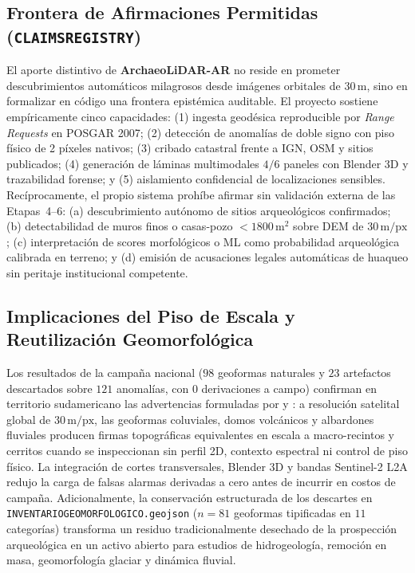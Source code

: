 \documentclass[11pt,a4paper]{article}
\DeclareRobustCommand{\_}{\ifmmode\mbox{\textunderscore}\else\textunderscore\allowbreak\fi}
\begin{document}
\subsection{Frontera de Afirmaciones Permitidas (\texttt{CLAIMS\_REGISTRY})}

El aporte distintivo de \textbf{ArchaeoLiDAR-AR} no reside en prometer descubrimientos autom\'aticos milagrosos desde im\'agenes orbitales de $30\,\mathrm{m}$, sino en formalizar en c\'odigo una frontera epist\'emica auditable. El proyecto sostiene emp\'iricamente cinco capacidades: (1) ingesta geod\'esica reproducible por \emph{Range Requests} en POSGAR 2007; (2) detecci\'on de anomal\'ias de doble signo con piso f\'isico de 2 p\'ixeles nativos; (3) cribado catastral frente a IGN, OSM y sitios publicados; (4) generaci\'on de l\'aminas multimodales $4/6$ paneles con Blender 3D y trazabilidad forense; y (5) aislamiento confidencial de localizaciones sensibles. Rec\'iprocamente, el propio sistema proh\'ibe afirmar sin validaci\'on externa de las Etapas~4--6: (a) descubrimiento aut\'onomo de sitios arqueol\'ogicos confirmados; (b) detectabilidad de muros finos o casas-pozo $<1800\,\mathrm{m}^2$ sobre DEM de $30\,\mathrm{m/px}$; (c) interpretaci\'on de scores morfol\'ogicos o ML como probabilidad arqueol\'ogica calibrada en terreno; y (d) emisi\'on de acusaciones legales autom\'aticas de huaqueo sin peritaje institucional competente.

\subsection{Implicaciones del Piso de Escala y Reutilizaci\'on Geomorfol\'ogica}

Los resultados de la campa\~na nacional ($98$ geoformas naturales y $23$ artefactos descartados sobre $121$ anomal\'ias, con $0$ derivaciones a campo) confirman en territorio sudamericano las advertencias formuladas por \citet{Casana2014} y \citet{Vinci2024}: a resoluci\'on satelital global de $30\,\mathrm{m/px}$, las geoformas coluviales, domos volc\'anicos y albardones fluviales producen firmas topogr\'aficas equivalentes en escala a macro-recintos y cerritos cuando se inspeccionan sin perfil 2D, contexto espectral ni control de piso f\'isico. La integraci\'on de cortes transversales, Blender 3D y bandas Sentinel-2 L2A redujo la carga de falsas alarmas derivadas a cero antes de incurrir en costos de campa\~na. Adicionalmente, la conservaci\'on estructurada de los descartes en \texttt{INVENTARIO\_GEOMORFOLOGICO.geojson} ($n=81$ geoformas tipificadas en $11$ categor\'ias) transforma un residuo tradicionalmente desechado de la prospecci\'on arqueol\'ogica en un activo abierto para estudios de hidrogeolog\'ia, remoci\'on en masa, geomorfolog\'ia glaciar y din\'amica fluvial.
\end{document}
